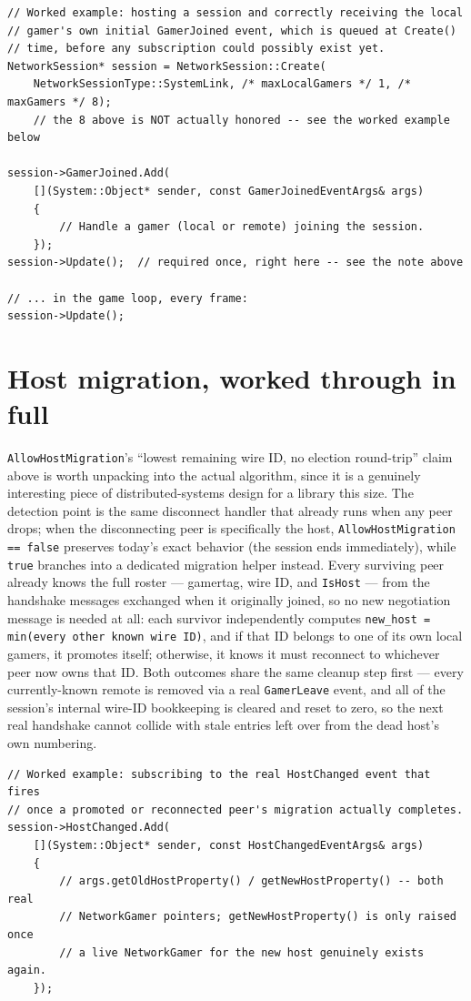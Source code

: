 \begin{lstlisting}
// Worked example: hosting a session and correctly receiving the local
// gamer's own initial GamerJoined event, which is queued at Create()
// time, before any subscription could possibly exist yet.
NetworkSession* session = NetworkSession::Create(
    NetworkSessionType::SystemLink, /* maxLocalGamers */ 1, /* maxGamers */ 8);
    // the 8 above is NOT actually honored -- see the worked example below

session->GamerJoined.Add(
    [](System::Object* sender, const GamerJoinedEventArgs& args)
    {
        // Handle a gamer (local or remote) joining the session.
    });
session->Update();  // required once, right here -- see the note above

// ... in the game loop, every frame:
session->Update();
\end{lstlisting}

\section{Host migration, worked through in full}

\texttt{AllowHostMigration}'s ``lowest remaining wire ID, no election round-trip'' claim above
is worth unpacking into the actual algorithm, since it is a genuinely interesting piece of
distributed-systems design for a library this size. The detection point is the same
disconnect handler that already runs when any peer drops; when the disconnecting peer is
specifically the host, \texttt{AllowHostMigration == false} preserves today's exact behavior
(the session ends immediately), while \texttt{true} branches into a dedicated migration
helper instead. Every surviving peer already knows the full roster --- gamertag, wire ID, and
\texttt{IsHost} --- from the handshake messages exchanged when it originally joined, so no new
negotiation message is needed at all: each survivor independently computes
\texttt{new\_host = min(every other known wire ID)}, and if that ID belongs to one of its own
local gamers, it promotes itself; otherwise, it knows it must reconnect to whichever peer now
owns that ID. Both outcomes share the same cleanup step first --- every currently-known remote
 is removed via a real \texttt{GamerLeave} event, and all of the
session's internal wire-ID bookkeeping is cleared and reset to zero, so the next real handshake
cannot collide with stale entries left over from the dead host's own numbering.

\begin{lstlisting}
// Worked example: subscribing to the real HostChanged event that fires
// once a promoted or reconnected peer's migration actually completes.
session->HostChanged.Add(
    [](System::Object* sender, const HostChangedEventArgs& args)
    {
        // args.getOldHostProperty() / getNewHostProperty() -- both real
        // NetworkGamer pointers; getNewHostProperty() is only raised once
        // a live NetworkGamer for the new host genuinely exists again.
    });
\end{lstlisting}

